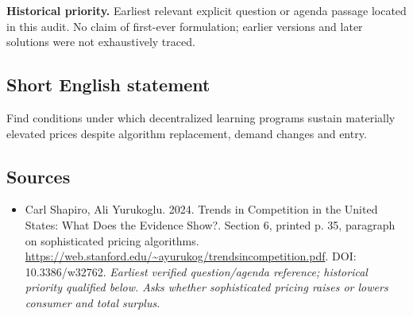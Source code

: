 \documentclass[11pt]{article}
\begin{document}
\par\textbf{Historical priority.} Earliest relevant explicit question or agenda passage located in this audit. No claim of first-ever formulation; earlier versions and later solutions were not exhaustively traced.

\subsection{Short English statement}
Find conditions under which decentralized learning programs sustain materially elevated prices despite algorithm replacement, demand changes and entry.

\subsection{Sources}
\begin{itemize}\raggedright
\item[\textnormal{[S1]}]\hypertarget{source:30007680:1}{} Carl Shapiro, Ali Yurukoglu. 2024. Trends in Competition in the United States: What Does the Evidence Show?. Section 6, printed p. 35, paragraph on sophisticated pricing algorithms.
\url{https://web.stanford.edu/~ayurukog/trendsincompetition.pdf}.
DOI: 10.3386/w32762.
{\small\textit{Earliest verified question/agenda reference; historical priority qualified below. Asks whether sophisticated pricing raises or lowers consumer and total surplus.}}
\end{itemize}
\end{document}
